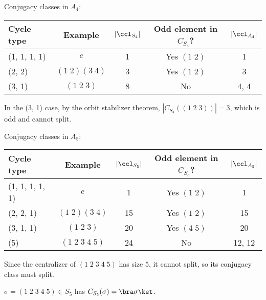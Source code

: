 \documentclass[a4paper]{article}
\begin{document}
\begin{eg}
  Conjugacy classes in $A_4$:
  \begin{center}
    \begin{tabular}{lcccc}
      \toprule
      Cycle type   & Example          & $|\ccl_{S_4}|$ & Odd element in $C_{S_4}$? & $|\ccl_{A_4}|$ \\
      \midrule
      (1, 1, 1, 1) & $e$              & 1              & Yes $(1\; 2)$      & 1              \\
      (2, 2)       & $(1\; 2)(3\; 4)$ & 3              & Yes $(1\; 2)$      & 3              \\
      (3, 1)       & $(1\; 2\; 3)$    & 8              & No                 & 4, 4           \\
      \bottomrule
    \end{tabular}
  \end{center}
  In the (3, 1) case, by the orbit stabilizer theorem, $|C_{S_4}((1\; 2\; 3))| = 3$, which is odd and cannot split.
\end{eg}

\begin{eg}
  Conjugacy classes in $A_5$:
  \begin{center}
    \begin{tabular}{lcccc}
      \toprule
      Cycle type      & Example               & $|\ccl_{S_5}|$ & Odd element in $C_{S_5}$? & $|\ccl_{A_5}|$ \\
      \midrule
      (1, 1, 1, 1, 1) & $e$                   & 1              & Yes $(1\; 2)$      & 1              \\
      (2, 2, 1)       & $(1\; 2)(3\; 4)$      & 15             & Yes $(1\; 2)$      & 15             \\
      (3, 1, 1)       & $(1\; 2\; 3)$         & 20             & Yes $(4\; 5)$      & 20             \\
      (5)             & $(1\; 2\; 3\; 4\; 5)$ & 24             & No                 & 12, 12         \\
      \bottomrule
    \end{tabular}
  \end{center}
  Since the centralizer of $(1\; 2\; 3\; 4\; 5)$ has size $5$, it cannot split, so its conjugacy class must split.
\end{eg}

\begin{lemma}
  $\sigma = (1\; 2\; 3\; 4\; 5)\in S_5$ has $C_{S_5}(\sigma) = \bra \sigma \ket$. \end{lemma}
\end{document}

